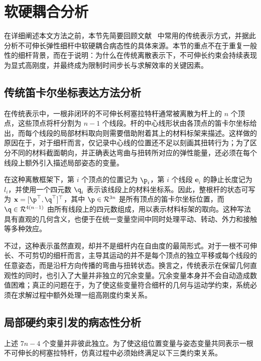 \section{软硬耦合分析}\label{sec: background}

在详细阐述本文方法之前，本节先简要回顾文献~\cite{spillmann_corde_2007} 中常用的传统表示方式，并据此分析不可伸长弹性细杆中软硬耦合病态性的具体来源。本节的重点不在于重复一般性的细杆背景，而在于说明：为什么在传统离散表示下，不可伸长约束会持续表现为显式高刚度，并最终成为限制时间步长与求解效率的关键因素。

\subsection{传统笛卡尔坐标表达方法分析}

在传统表示中，一根非闭环的不可伸长柯塞拉特杆通常被离散为杆上的 $n$ 个顶点，这些顶点将杆分割为 $n-1$ 个线段。杆的中心线形状由各顶点的笛卡尔坐标给出，而每个线段的局部材料取向则需要借助附着其上的材料标架来描述。这样做的原因在于，对于细杆而言，仅记录中心线的位置还不足以刻画其扭转行为；为了区分不同的材料截面朝向，并正确表达弯曲与扭转所对应的弹性能量，还必须在每个线段上额外引入描述局部姿态的变量。

在这种离散框架下，第 $i$ 个顶点的位置记为 $\p_i$，第 $i$ 个线段 $\mathbf{e}_i$ 的静止长度记为 $l_i$，并使用一个四元数 $\q_i$ 表示该线段上的材料坐标系。因此，整根杆的状态可写为 $\mathbf{x} = [\p^\top, \q^\top]^\top$，其中 $\p\in \mathcal{R}^{3n}$ 是所有顶点的笛卡尔坐标位置，而 $\q\in \mathcal{R}^{4(n-1)}$ 由所有线段上的四元数组成，用以表示材料标架的取向。这种写法具有直观的几何含义，也便于在统一变量空间中同时处理平动、转动、外力和接触等多种效应。

不过，这种表示虽然直观，却并不是细杆内在自由度的最简形式。对于一根不可伸长、不可剪切的细杆而言，主导其运动的并不是每个顶点的独立平移或每个线段的任意姿态，而是沿杆方向传播的弯曲与扭转状态。换言之，传统表示在保留几何直观性的同时，也引入了大量并非独立的冗余变量。冗余变量本身并不会自动造成数值困难；真正的问题在于，为了使这些变量符合细杆的几何与运动学约束，系统必须在求解过程中额外处理一组高刚度约束关系。

\subsection{局部硬约束引发的病态性分析}

上述 $7n-4$ 个变量并非彼此独立。为了使这组位置变量与姿态变量共同表示一根不可伸长的柯塞拉特杆，仿真过程中必须始终满足以下三类约束关系。

